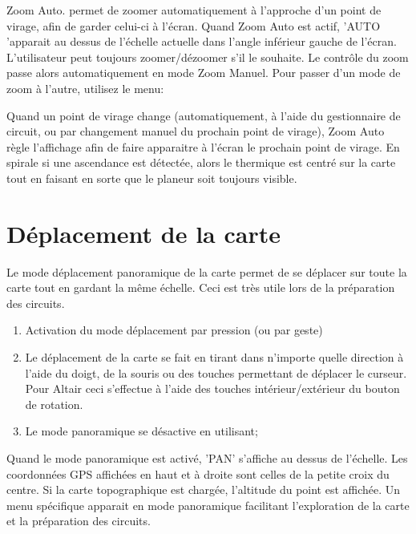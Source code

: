 Zoom Auto. permet de zoomer automatiquement à l'approche d'un point de virage, afin de garder celui-ci à l'écran.  Quand Zoom Auto est actif, 'AUTO 'apparait au dessus de l'échelle actuelle dans l'angle inférieur gauche de l'écran. L'utilisateur peut toujours zoomer/dézoomer s'il le souhaite. Le contrôle du zoom passe alors automatiquement en mode Zoom Manuel.
Pour passer d'un mode de zoom à l'autre, utilisez le menu:
\begin{quote}
\blink{}
\end{quote}
Quand un point de virage change (automatiquement, à l'aide du gestionnaire de circuit, ou par changement manuel du prochain point de virage), Zoom Auto règle l'affichage afin de faire apparaitre à l'écran le prochain point de virage.
En spirale si une ascendance est détectée, alors le thermique est centré sur la carte tout en faisant en sorte que le planeur soit toujours visible.

\section{Déplacement de la carte}\label{sec:panning}
Le mode déplacement panoramique de la carte permet de se déplacer sur toute la carte tout en gardant la même échelle. Ceci est très utile lors de la préparation des circuits.
\begin{enumerate}
\item Activation du mode déplacement par pression (ou par geste)  
\begin{quote}
\blink{}
\end{quote}

\item Le déplacement de la carte se fait en tirant dans n'importe quelle direction à l'aide du doigt, de la souris ou des touches permettant de déplacer le curseur. Pour Altair ceci s'effectue à l'aide des  touches intérieur/extérieur du bouton de rotation.
\item Le mode panoramique se désactive en utilisant;
\begin{quote}
\end{quote}
\end{enumerate}

Quand le mode panoramique est activé, 'PAN' s'affiche au dessus de l'échelle. Les coordonnées GPS affichées en haut et à droite sont celles de la petite croix du centre. Si la carte topographique est chargée, l'altitude du point est affichée.
Un menu spécifique apparait en mode panoramique facilitant l'exploration de la carte et la préparation des circuits.

